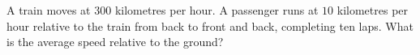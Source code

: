 A train moves at $300$ kilometres per hour. A passenger runs at $10$ kilometres per hour relative to the train from back to front and back, completing ten laps. What is the average speed relative to the ground?
